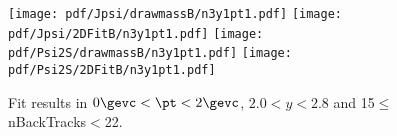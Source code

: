 \begin{figure}[H]
\begin{center}
\texttt{[image: pdf/Jpsi/drawmassB/n3y1pt1.pdf]}
\texttt{[image: pdf/Jpsi/2DFitB/n3y1pt1.pdf]}
\vspace*{-0.5cm}
\texttt{[image: pdf/Psi2S/drawmassB/n3y1pt1.pdf]}
\texttt{[image: pdf/Psi2S/2DFitB/n3y1pt1.pdf]}
\vspace*{-0.5cm}
\end{center}
\caption{Fit results in $0\gevc<\pt<2\gevc$, $2.0<y<2.8$ and 15$\leq$nBackTracks$<$22.}
\label{Fitn3y1pt1}
\end{figure}
